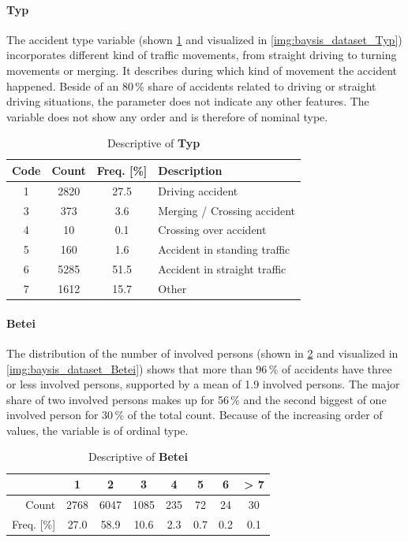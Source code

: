 \paragraph{Typ}
\label{baysis_dataset_Typ}
The accident type variable (shown \cref{tbl:baysis_dataset_Typ} and visualized in \cref{img:baysis_dataset_Typ}) incorporates different kind of traffic movements, from straight driving to turning movements or merging. It describes during which kind of movement the accident happened. Beside of an 80\,\% share of accidents related to driving or straight driving situations, the parameter does not indicate any other features. The variable does not show any order and is therefore of nominal type.
\begin{table}[!ht]
	\centering
	\small
	\begin{tabular}{c|c|c|l} 
		\toprule
		Code & Count & Freq. [\%] & Description \\ 
		\midrule
 		1 & 2820	& 27.5	& Driving accident \\ 
 		3 & 373		& 3.6 	& Merging / Crossing accident \\
 		4 & 10		& 0.1	& Crossing over accident \\
 		5 & 160 	& 1.6	& Accident in standing traffic \\
 		6 & 5285	& 51.5	& Accident in straight traffic \\
		7 & 1612	& 15.7 	& Other \\
		\bottomrule
	\end{tabular}
	\caption{Descriptive of \textbf{Typ}}
	\label{tbl:baysis_dataset_Typ}
	\vspace{-8mm}
\end{table}

\paragraph{Betei}
\label{baysis_dataset_Betei}
The distribution of the number of involved persons (shown in \cref{tbl:baysis_dataset_Betei} and visualized in \cref{img:baysis_dataset_Betei}) shows that more than 96\,\% of accidents have three or less involved persons, supported by a mean of 1.9 involved persons. The major share of two involved persons makes up for 56\,\% and the second biggest of one involved person for 30\,\% of the total count. Because of the increasing order of values, the variable is of ordinal type.
\begin{table}[!ht]
	\centering
	\small
	\begin{tabular}{r|ccccccc} 
		\toprule
		 			& 1		& 2		& 3		& 4		& 5		& 6  	& > 7\\ 
		\midrule
 		Count 		& 2768	& 6047	& 1085	& 235	& 72 	& 24	& 30 \\ 
 		Freq. [\%] 	& 27.0	& 58.9	& 10.6 	& 2.3	& 0.7 	& 0.2 	& 0.1 \\
		\bottomrule
	\end{tabular}
	\caption{Descriptive of \textbf{Betei}}
	\label{tbl:baysis_dataset_Betei}
	\vspace{-8mm}
\end{table}

